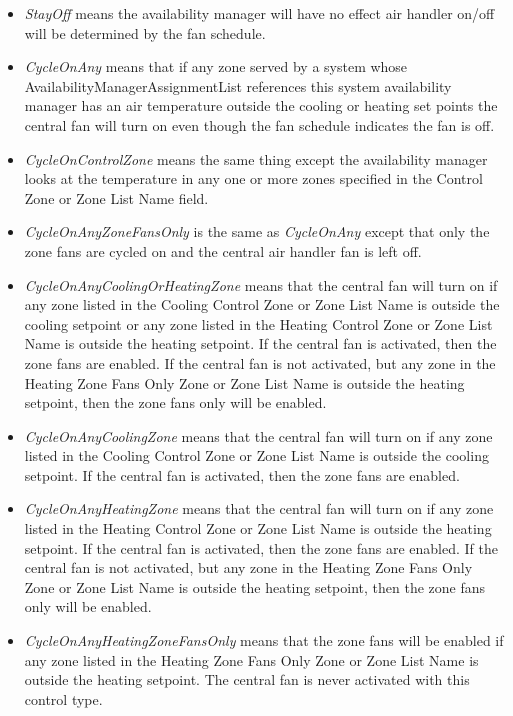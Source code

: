 \begin{itemize}
\tightlist
\item  \emph{StayOff} means the availability manager will have no effect air handler on/off will be determined by the fan schedule. 
\item  \emph{CycleOnAny} means that if any zone served by a system whose AvailabilityManagerAssignmentList references this system availability manager has an air temperature outside the cooling or heating set points the central fan will turn on even though the fan schedule indicates the fan is off. 
\item  \emph{CycleOnControlZone} means the same thing except the availability manager looks at the temperature in any one or more zones specified in the Control Zone or Zone List Name field. 
\item  \emph{CycleOnAnyZoneFansOnly} is the same as \emph{CycleOnAny} except that only the zone fans are cycled on and the central air handler fan is left off. 
\item  \emph{CycleOnAnyCoolingOrHeatingZone} means that the central fan will turn on if any zone listed in the Cooling Control Zone or Zone List Name is outside the cooling setpoint or any zone listed in the Heating Control Zone or Zone List Name is outside the heating setpoint. If the central fan is activated, then the zone fans are enabled.  If the central fan is not activated, but any zone in the Heating Zone Fans Only Zone or Zone List Name is outside the heating setpoint, then the zone fans only will be enabled.
\item  \emph{CycleOnAnyCoolingZone} means that the central fan will turn on if any zone listed in the Cooling Control Zone or Zone List Name is outside the cooling setpoint. If the central fan is activated, then the zone fans are enabled.  
\item  \emph{CycleOnAnyHeatingZone} means that the central fan will turn on if any zone listed in the Heating Control Zone or Zone List Name is outside the heating setpoint. If the central fan is activated, then the zone fans are enabled.   If the central fan is not activated, but any zone in the Heating Zone Fans Only Zone or Zone List Name is outside the heating setpoint, then the zone fans only will be enabled. 
\item  \emph{CycleOnAnyHeatingZoneFansOnly} means that the zone fans will be enabled if any zone listed in the Heating Zone Fans Only Zone or Zone List Name is outside the heating setpoint. The central fan is never activated with this control type.
\end{itemize}

